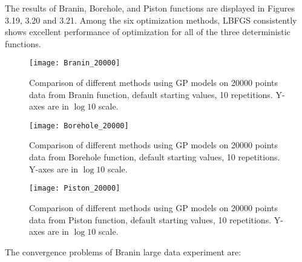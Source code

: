 The results of Branin, Borehole, and Piston functions are displayed in Figures 3.19, 3.20 and 3.21. Among the six optimization methods, LBFGS consistently shows excellent performance of optimization for all of the three deterministic functions. 


\begin{figure}[hbt!]%
  \centering
  \texttt{[image: Branin\_20000]} %
  \caption[Times of Branin of 20000 points: line graphs with range bars]%
  {Comparison of different methods using GP models on 20000 points data from Branin function, default starting values, 10 repetitions. Y-axes are in $\log 10$ scale.}%
  \label{fig:plotset}
\end{figure}

\begin{figure}[hbt!]%
  \centering
  \texttt{[image: Borehole\_20000]} %
  \caption[Times of Borehole of 20000 points: line graphs with range bars]%
  {Comparison of different methods using GP models on 20000 points data from Borehole function, default starting values, 10 repetitions. Y-axes are in $\log 10$ scale.}%
  \label{fig:plotset}
\end{figure}

\begin{figure}[hbt!]%
  \centering
  \texttt{[image: Piston\_20000]} %
  \caption[Times of Piston of 20000 points: line graphs with range bars]%
  {Comparison of different methods using GP models on 20000 points data from Piston function, default starting values, 10 repetitions. Y-axes are in $\log 10$ scale.}%
  \label{fig:plotset}
\end{figure}

The convergence problems of Branin large data experiment are:


